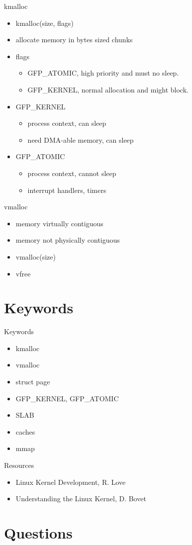\documentclass{workshop}
\begin{document}
\begin{frame}{kmalloc}
  \begin{itemize}
    \item kmalloc(size, flags)
    \item allocate memory in bytes sized chunks
     \item flags
    \begin{itemize}
	\item GFP_ATOMIC, high priority and must no sleep.
	\item GFP_KERNEL, normal allocation and might block.
    \end{itemize}
  \item GFP_KERNEL
	\begin{itemize}
	\item process context, can sleep
	\item need DMA-able memory, can sleep
	\end{itemize}
   \item GFP_ATOMIC
	\begin{itemize}
	\item process context, cannot sleep
	\item interrupt handlers, timers
	\end{itemize}
  \end{itemize}
\end{frame}

\begin{frame}{vmalloc}
  \begin{itemize}
  \item memory virtually contiguous
  \item memory not physically contiguous
   \item vmalloc(size)
  \item vfree
  \end{itemize}
\end{frame}



\section{Keywords}

\begin{frame}{Keywords}
      \begin{itemize}
        \item kmalloc
        \item vmalloc
        \item struct page
        \item GFP_KERNEL, GFP_ATOMIC
        \item SLAB
        \item caches
        \item mmap
      \end{itemize}
\end{frame}

\begin{frame}{Resources}
  \begin{itemize}
    \item Linux Kernel Development, R. Love
    \item Understanding the Linux Kernel, D. Bovet
  \end{itemize}
\end{frame}

\section{Questions}
\end{document}
